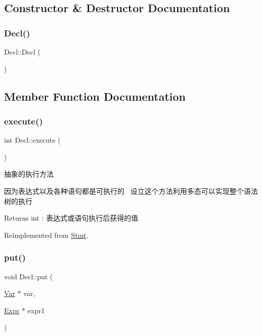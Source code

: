 \subsection{Constructor \& Destructor Documentation}
\mbox{\label{class_decl_a356b82bee7d66a98c8fbb3547836b785}} 
\subsubsection{\texorpdfstring{Decl()}{Decl()}}
{\footnotesize\ttfamily Decl\+::\+Decl (\begin{DoxyParamCaption}{ }\end{DoxyParamCaption})}



\subsection{Member Function Documentation}
\mbox{\label{class_decl_ad6495a4245a45dcdcd05e239c8db4a8b}} 
\subsubsection{\texorpdfstring{execute()}{execute()}}
{\footnotesize\ttfamily int Decl\+::execute (\begin{DoxyParamCaption}{ }\end{DoxyParamCaption})\hspace{0.3cm}{\ttfamily [virtual]}}



抽象的执行方法 

因为表达式以及各种语句都是可执行的~\newline
设立这个方法利用多态可以实现整个语法树的执行~\newline
 \begin{DoxyReturn}{Returns}
int \+: 表达式或语句执行后获得的值 
\end{DoxyReturn}


Reimplemented from \hyperlink{class_stmt_abdc3261770c3c5bd3ce5b3ba6eedfaa4}{Stmt}.

\mbox{\label{class_decl_a4c91db9c289b90f3045783f6bf53a688}} 
\subsubsection{\texorpdfstring{put()}{put()}}
{\footnotesize\ttfamily void Decl\+::put (\begin{DoxyParamCaption}\item[{\hyperlink{class_var}{Var} $\ast$}]{var,  }\item[{\hyperlink{class_expr}{Expr} $\ast$}]{expr1 }\end{DoxyParamCaption})}



